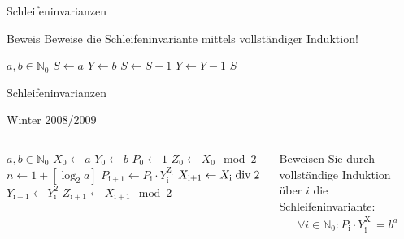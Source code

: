 \begin{frame}{Schleifeninvarianzen}
    \begin{exampleblock}{Beweis}
        Beweise die Schleifeninvariante mittels vollständiger Induktion!
        \begin{algorithm}
            \begin{algorithmic}
                \Require $a, b \in \mathbb{N}_0$
                \State $S \gets a$
                \State $Y \gets b$
                    \State $ S \gets S + 1$
                    \State $Y \gets Y -1$
                \EndFor
                \Ensure $S$
            \end{algorithmic}
        \end{algorithm}
    \end{exampleblock}
\end{frame}

\begin{frame}{Schleifeninvarianzen}
    \begin{exampleblock}{Winter 2008/2009}
        \begin{columns}
                \begin{algorithm}
                    \begin{algorithmic}
                        \Require $a, b \in \mathbb{N}_0$
                        \State $X_0 \gets a$
                        \State $Y_0 \gets b$
                        \State $P_0 \gets 1$
                        \State $Z_0 \gets X_0 \mod 2$
                        \State $n \gets 1 + \left[ \log_2 a\right]$
                            \State $P_\mathrm{i+1} \gets P_\mathrm{i}\cdot Y_\mathrm{i}^\mathrm{Z_\mathrm{i}}$
                            \State $X_\mathrm{i+1} \gets X_\mathrm{i} \bdiv 2$
                            \State $Y_\mathrm{i+1} \gets Y_\mathrm{i}^2$
                            \State $Z_\mathrm{i+1} \gets X_\mathrm{i+1} \mod 2$
                        \EndFor
                    \end{algorithmic}
                \end{algorithm}
                Beweisen Sie durch vollständige Induktion über $i$ die Schleifeninvariante:
                \begin{align*}
                    \forall i \in \mathbb{N}_0: P_\mathrm{i} \cdot Y_\mathrm{i}^\mathrm{X_\mathrm{i}} = b^a
            \end{align*}
        \end{columns}
    \end{exampleblock}
\end{frame}


